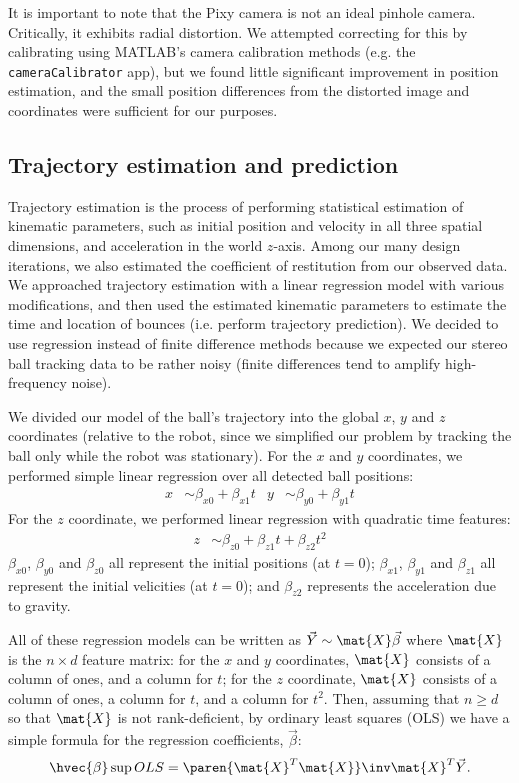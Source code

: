 \documentclass[letterpaper, 11pt]{article}
\renewcommand{\v}[1]{\vec{#1}}
\begin{document}
It is important to note that the Pixy camera is not an ideal pinhole camera. Critically, it exhibits radial distortion. We attempted correcting for this by calibrating using MATLAB's camera calibration methods (e.g. the \verb|cameraCalibrator| app), but we found little significant improvement in position estimation, and the small position differences from the distorted image and coordinates were sufficient for our purposes.

\subsection{Trajectory estimation and prediction}
\label{sec:trajectory}
Trajectory estimation is the process of performing statistical estimation of kinematic parameters, such as initial position and velocity in all three spatial dimensions, and acceleration in the world $z$-axis. Among our many design iterations, we also estimated the coefficient of restitution from our observed data. We approached trajectory estimation with a linear regression model with various modifications, and then used the estimated kinematic parameters to estimate the time and location of bounces (i.e. perform trajectory prediction). We decided to use regression instead of finite difference methods because we expected our stereo ball tracking data to be rather noisy (finite differences tend to amplify high-frequency noise).

We divided our model of the ball's trajectory into the global $x$, $y$ and $z$ coordinates (relative to the robot, since we simplified our problem by tracking the ball only while the robot was stationary). For the $x$ and $y$ coordinates, we performed simple linear regression over all detected ball positions:
\begin{align*}
    x &\sim \beta_{x0} + \beta_{x1}t & y &\sim \beta_{y0} + \beta_{y1}t
\end{align*}
For the $z$ coordinate, we performed linear regression with quadratic time features:
\begin{align*}
    z &\sim \beta_{z0} + \beta_{z1}t + \beta_{z2}t^2
\end{align*}
$\beta_{x0}$, $\beta_{y0}$ and $\beta_{z0}$ all represent the initial positions (at $t=0$); $\beta_{x1}$, $\beta_{y1}$ and $\beta_{z1}$ all represent the initial velicities (at $t=0$); and $\beta_{z2}$ represents the acceleration due to gravity.

All of these regression models can be written as $\v{Y} \sim \mat{X} \v{\beta}$ where $\mat{X}$ is the $n\times d$ feature matrix: for the $x$ and $y$ coordinates, $\mat{X}$ consists of a column of ones, and a column for $t$; for the $z$ coordinate, $\mat{X}$ consists of a column of ones, a column for $t$, and a column for $t^2$. Then, assuming that $n\ge d$ so that $\mat{X}$ is not rank-deficient, by ordinary least squares (OLS) we have a simple formula for the regression coefficients, $\v{\beta}$:
\[ \hvec{\beta}\sup{OLS} = \paren{ \mat{X}^T\mat{X} }\inv \mat{X}^T \v{Y}. \]
\end{document}
